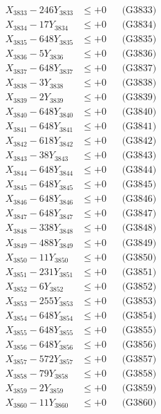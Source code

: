 \documentclass[a4paper,10pt]{article}
\begin{document}
{\begin{align}
X_{3833} - 246Y_{3833} &\leq +0 && \text{(G3833)} \\
X_{3834} - 17Y_{3834} &\leq +0 && \text{(G3834)} \\
X_{3835} - 648Y_{3835} &\leq +0 && \text{(G3835)} \\
X_{3836} - 5Y_{3836} &\leq +0 && \text{(G3836)} \\
X_{3837} - 648Y_{3837} &\leq +0 && \text{(G3837)} \\
X_{3838} - 3Y_{3838} &\leq +0 && \text{(G3838)} \\
X_{3839} - 2Y_{3839} &\leq +0 && \text{(G3839)} \\
X_{3840} - 648Y_{3840} &\leq +0 && \text{(G3840)} \\
\allowbreak
X_{3841} - 648Y_{3841} &\leq +0 && \text{(G3841)} \\
X_{3842} - 618Y_{3842} &\leq +0 && \text{(G3842)} \\
X_{3843} - 38Y_{3843} &\leq +0 && \text{(G3843)} \\
X_{3844} - 648Y_{3844} &\leq +0 && \text{(G3844)} \\
X_{3845} - 648Y_{3845} &\leq +0 && \text{(G3845)} \\
X_{3846} - 648Y_{3846} &\leq +0 && \text{(G3846)} \\
X_{3847} - 648Y_{3847} &\leq +0 && \text{(G3847)} \\
X_{3848} - 338Y_{3848} &\leq +0 && \text{(G3848)} \\
X_{3849} - 488Y_{3849} &\leq +0 && \text{(G3849)} \\
X_{3850} - 11Y_{3850} &\leq +0 && \text{(G3850)} \\
\allowbreak
X_{3851} - 231Y_{3851} &\leq +0 && \text{(G3851)} \\
X_{3852} - 6Y_{3852} &\leq +0 && \text{(G3852)} \\
X_{3853} - 255Y_{3853} &\leq +0 && \text{(G3853)} \\
X_{3854} - 648Y_{3854} &\leq +0 && \text{(G3854)} \\
X_{3855} - 648Y_{3855} &\leq +0 && \text{(G3855)} \\
X_{3856} - 648Y_{3856} &\leq +0 && \text{(G3856)} \\
X_{3857} - 572Y_{3857} &\leq +0 && \text{(G3857)} \\
X_{3858} - 79Y_{3858} &\leq +0 && \text{(G3858)} \\
X_{3859} - 2Y_{3859} &\leq +0 && \text{(G3859)} \\
X_{3860} - 11Y_{3860} &\leq +0 && \text{(G3860)} \\

\end{align}}
\end{document}
